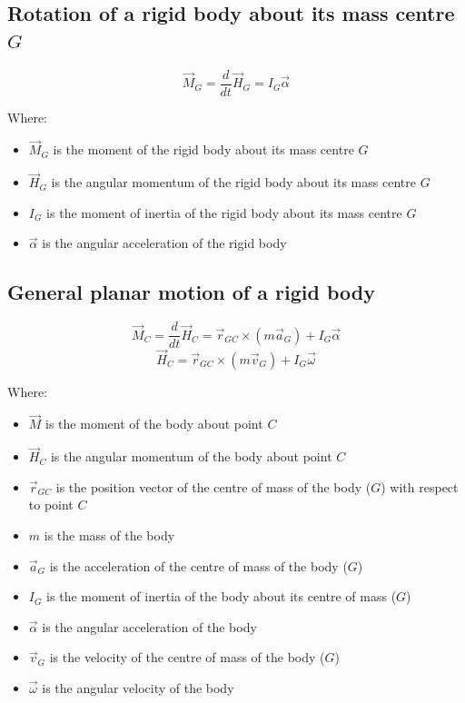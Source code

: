\documentclass[11pt]{article}
\begin{document}
\subsection{Rotation of a rigid body about its mass centre \(G\)}
\label{sec:org7b4e830}
\[\vec{M}_G = \frac{d}{dt} \vec{H}_G = I_G \vec{\alpha}\]

Where:
\begin{itemize}
\item \(\vec{M}_G\) is the moment of the rigid body about its mass centre \(G\)
\item \(\vec{H}_G\) is the angular momentum of the rigid body about its mass centre \(G\)
\item \(I_G\) is the moment of inertia of the rigid body about its mass centre \(G\)
\item \(\vec{\alpha}\) is the angular acceleration of the rigid body
\end{itemize}

\subsection{General planar motion of a rigid body}
\label{sec:org5774203}
\[\vec{M}_C = \frac{d}{dt} \vec{H}_C = \vec{r}_{GC} \times (m \vec{a}_G) + I_G \vec{\alpha}\]
\[\vec{H}_C = \vec{r}_{GC} \times (m \vec{v}_G) + I_{G} \vec{\omega}\]

Where:
\begin{itemize}
\item \(\vec{M}\) is the moment of the body about point \(C\)
\item \(\vec{H}_C\) is the angular momentum of the body about point \(C\)
\item \(\vec{r}_{GC}\) is the position vector of the centre of mass of the body (\(G\)) with respect to point \(C\)
\item \(m\) is the mass of the body
\item \(\vec{a}_G\) is the acceleration of the centre of mass of the body (\(G\))
\item \(I_G\) is the moment of inertia of the body about its centre of mass (\(G\))
\item \(\vec{\alpha}\) is the angular acceleration of the body
\item \(\vec{v}_G\) is the velocity of the centre of mass of the body (\(G\))
\item \(\vec{\omega}\) is the angular velocity of the body
\end{itemize}
\end{document}
